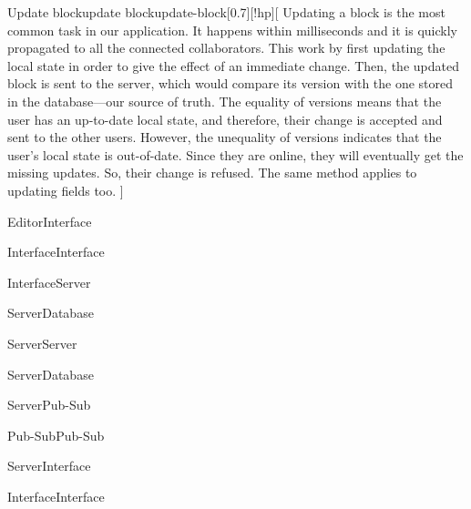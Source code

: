 \begin{sdfig}{Update block}{update block}{update-block}[0.7][!hp][
    Updating a block is the most common task in our application. It happens within milliseconds and it is quickly propagated to all the connected collaborators.
    This work by first updating the local state in order to give the effect of an immediate change. Then, the updated block is sent to the server, which would compare its version with the one stored in the database---our source of truth.
    The equality of versions means that the user has an up-to-date local state, and therefore, their change is accepted and sent to the other users. However, the unequality of versions indicates that the user's local state is out-of-date. Since they are online, they will eventually get the missing updates. So, their change is refused.
    The same method applies to updating fields too.
  ]

  \begin{seqdigauth}[Editor]
    \begin{umlcall}[op={Update block}]{Editor}{Interface}
      \begin{umlcall}[op={Update local state}]{Interface}{Interface}
      \end{umlcall}
      \begin{umlcall}[op={Update block}]{Interface}{Server}
        \begin{umlcall}[op={Get block}]{Server}{Database}
        \end{umlcall}

        \begin{umlcall}[op={Compare versions}]{Server}{Server}
          \begin{umlfragment}[type=alt, label=equal]
            \begin{umlcall}[op={Update block}]{Server}{Database}
            \end{umlcall}
            \begin{umlcall}[op={Propagate change}]{Server}{Pub-Sub}
            \end{umlcall}
            \begin{umlcall}[op={Propagate}]{Pub-Sub}{Pub-Sub}
            \end{umlcall}
            \umlfpart[else]
            \begin{umlcall}[op={Refuse change},type=return]{Server}{Interface}
              \begin{umlcall}[op={Update local state}]{Interface}{Interface}
              \end{umlcall}
            \end{umlcall}
          \end{umlfragment}
        \end{umlcall}
      \end{umlcall}
    \end{umlcall}
  \end{seqdigauth}
\end{sdfig}

